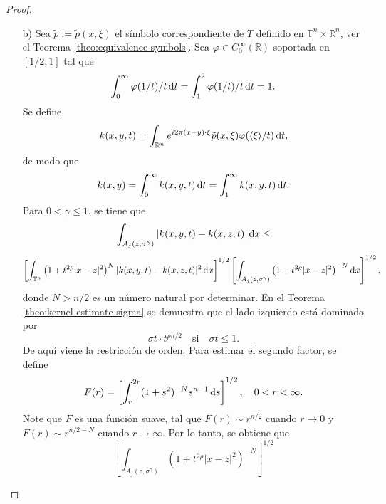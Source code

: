 \begin{proof}
\begin{itemize}
		\item[b)] Sea $\tilde{p}:=\tilde{p}(x,\xi)$ el símbolo correspondiente de $T$ definido en $\mathbb{T}^n \times \mathbb{R}^n$, ver el Teorema \ref{theo:equivalence-symbols}.  Sea $\varphi \in C_0^\infty(\mathbb{R})$ soportada en $[1/2, 1]$ tal que  
		\begin{equation*}
			\int_0^\infty \varphi(1/t)/t\mathop{}\!\mathrm{d} t = \int_1^2 \varphi(1/t)/t\mathop{}\!\mathrm{d} t=1.
		\end{equation*}
		Se define 
		\begin{equation*}
			k(x, y, t) = \int_{\mathbb{R}^n} e^{i2\pi (x-y) \cdot \xi} \tilde{p}(x, \xi) \varphi(\langle\xi\rangle/t)\mathop{}\!\mathrm{d} t,
		\end{equation*}
		de modo que 
		\begin{equation*}
			k(x, y) = \int_0^\infty k(x, y, t) \mathop{}\!\mathrm{d} t = \int_1^\infty k(x, y, t) \mathop{}\!\mathrm{d} t.
		\end{equation*}
		Para $0<\gamma\leq1$, se tiene que 
		\begin{equation*}
			\int_{A_j(z, \sigma^\gamma)} |k(x, y, t) - k(x, z, t)| \mathop{}\!\mathrm{d} x \leq
		\end{equation*}
		\begin{equation*}
			\left[ \int_{\mathbb{T}^n} \left(1 + t^{2\rho} |x-z|^2\right)^N 
			|k(x, y, t) - k(x, z, t)|^2 \mathop{}\!\mathrm{d} x
			\right]^{1/2}  \left[ \int_{A_j(z, \sigma^\gamma)} \left(1 + t^{2\rho} |x-z|^2\right)^{-N} \mathop{}\!\mathrm{d} x  \right]^{1/2},
		\end{equation*}
		donde $N>n/2$ es un número natural por determinar. En el Teorema  \ref{theo:kernel-estimate-sigma}  se demuestra que el lado izquierdo está dominado por 
		\begin{equation*}
			\sigma t \cdot t^{\rho n/2} \quad \text{si} \quad \sigma t\leq 1. 
		\end{equation*}
		De aquí viene la restricción de orden. Para estimar el segundo factor, se define 
		\begin{equation*}
			F(r) = \left[ \int_r^{2r} (1+s^2)^{-N} s^{n-1} \mathop{}\!\mathrm{d} s  \right]^{1/2}, \quad 0<r<\infty. 
		\end{equation*}
		Note que $F$ es una función suave, tal que $F(r) \sim r^{n/2}$ cuando $r\rightarrow 0$ y $F(r)\sim r^{n/2-N}$ cuando $r \rightarrow \infty$. Por lo tanto, se obtiene que
		\begin{equation*}
			\left[ \int_{A_j(z, \sigma^\gamma)} \left(1 + t^{2\rho} |x-z|^2\right)^{-N}  \right]^{1/2}
		\end{equation*}
		\begin{equation*}

\end{equation*}
\end{itemize}
\end{proof}
